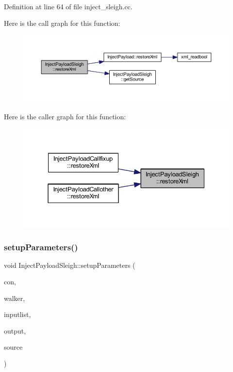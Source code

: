 Definition at line 64 of file inject\+\_\+sleigh.\+cc.

Here is the call graph for this function\+:
\nopagebreak
\begin{figure}[H]
\begin{center}
\leavevmode
\includegraphics[width=350pt]{class_inject_payload_sleigh_ae41de3f330c3cbb5327e94fcf3ae705c_cgraph}
\end{center}
\end{figure}
Here is the caller graph for this function\+:
\nopagebreak
\begin{figure}[H]
\begin{center}
\leavevmode
\includegraphics[width=331pt]{class_inject_payload_sleigh_ae41de3f330c3cbb5327e94fcf3ae705c_icgraph}
\end{center}
\end{figure}
\mbox{\label{class_inject_payload_sleigh_a2e0e17d52688e5404b7133d122b2e8aa}} 
\subsubsection{\texorpdfstring{setupParameters()}{setupParameters()}}
{\footnotesize\ttfamily void Inject\+Payload\+Sleigh\+::setup\+Parameters (\begin{DoxyParamCaption}\item[{\mbox{\hyperlink{class_inject_context_sleigh}{Inject\+Context\+Sleigh}} \&}]{con,  }\item[{\mbox{\hyperlink{class_parser_walker_change}{Parser\+Walker\+Change}} \&}]{walker,  }\item[{const vector$<$ \mbox{\hyperlink{class_inject_parameter}{Inject\+Parameter}} $>$ \&}]{inputlist,  }\item[{const vector$<$ \mbox{\hyperlink{class_inject_parameter}{Inject\+Parameter}} $>$ \&}]{output,  }\item[{const string \&}]{source }\end{DoxyParamCaption})\hspace{0.3cm}{\ttfamily [static]}}



